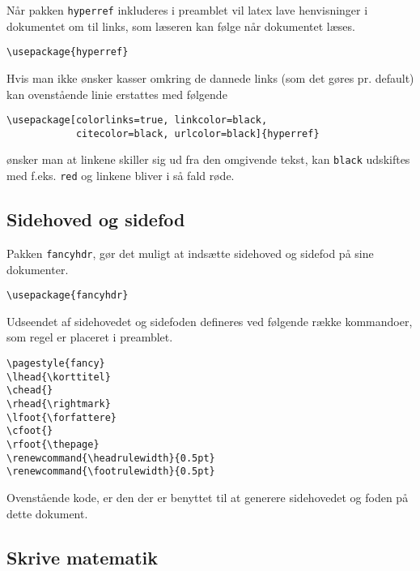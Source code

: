 \documentclass[11pt,a4paper,fleqn]{article}
\renewcommand{\headrulewidth}{0.5pt}
\renewcommand{\footrulewidth}{0.5pt}
\numberwithin{equation}{section}
\begin{document}
Når pakken \verb!hyperref! inkluderes i preamblet vil latex lave
henvisninger i dokumentet om til links, som læseren kan følge når
dokumentet læses.
%
\begin{lstlisting}
\usepackage{hyperref}
\end{lstlisting}
%
Hvis man ikke ønsker kasser omkring de dannede links (som det gøres
pr. default) kan ovenstående linie erstattes med følgende
%
\begin{lstlisting}
\usepackage[colorlinks=true, linkcolor=black, 
            citecolor=black, urlcolor=black]{hyperref}
\end{lstlisting}
%
ønsker man at linkene skiller sig ud fra den omgivende tekst, kan
\verb!black! udskiftes med f.eks. \verb!red! og linkene bliver i så
fald røde.


\subsection{Sidehoved og sidefod}

Pakken \verb!fancyhdr!, gør det muligt at indsætte sidehoved og
sidefod på sine dokumenter.
%
\begin{lstlisting}
\usepackage{fancyhdr}
\end{lstlisting}
%
Udseendet af sidehovedet og sidefoden defineres ved følgende række
kommandoer, som regel er placeret i preamblet.
%
\begin{lstlisting}
\pagestyle{fancy}
\lhead{\korttitel}
\chead{}
\rhead{\rightmark}
\lfoot{\forfattere}
\cfoot{}
\rfoot{\thepage}
\renewcommand{\headrulewidth}{0.5pt}
\renewcommand{\footrulewidth}{0.5pt}
\end{lstlisting}
%
Ovenstående kode, er den der er benyttet til at generere sidehovedet
og foden på dette dokument.

\subsection{Skrive matematik}
\end{document}
